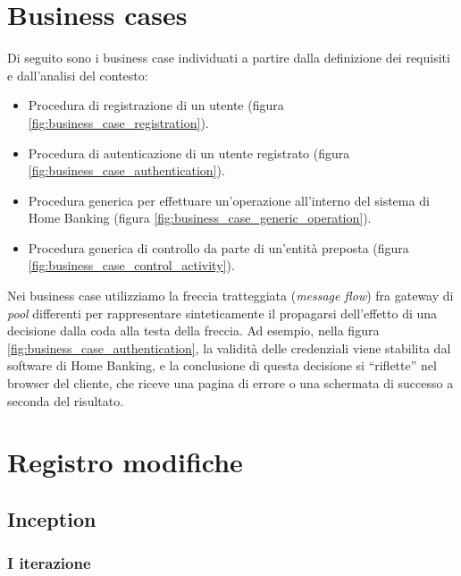 \documentclass[10pt]{softeng} %
\begin{document}
\startofdocument{}







\section{Business cases}

Di seguito sono i business case individuati a partire dalla definizione dei requisiti e dall'analisi del contesto:
\begin{itemize}
	\item Procedura di registrazione di un utente (figura \ref{fig:business_case_registration}).
	\item Procedura di autenticazione di un utente registrato (figura \ref{fig:business_case_authentication}).
	\item Procedura generica per effettuare un'operazione all'interno del sistema di Home Banking (figura \ref{fig:business_case_generic_operation}).
	\item Procedura generica di controllo da parte di un'entit\`a preposta (figura \ref{fig:business_case_control_activity}).
\end{itemize}
Nei business case utilizziamo la freccia tratteggiata (\emph{message flow}) fra gateway di \emph{pool} differenti per rappresentare sinteticamente il propagarsi dell'effetto di una decisione dalla coda alla testa della freccia.
Ad esempio, nella figura \ref{fig:business_case_authentication}, la validit\`a delle credenziali viene stabilita dal software di Home Banking, e la conclusione di questa decisione si ``riflette'' nel browser del cliente, che riceve una pagina di errore o una schermata di successo a seconda del risultato.

\section{Registro modifiche}

\subsection{Inception}

\subsubsection{I iterazione}
\end{document}
